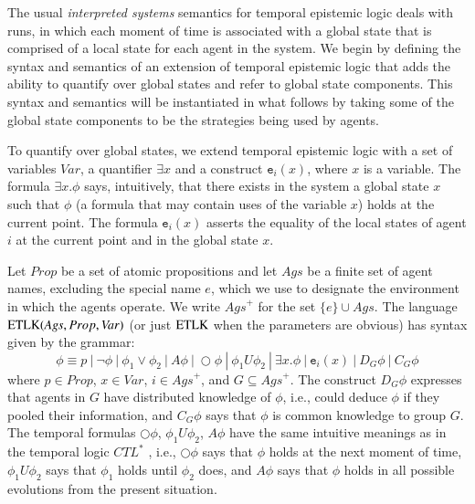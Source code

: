 \documentclass[a4wide]{article}
\newcommand{\until}{U}
\newcommand{\Prop}{Prop}
\newcommand{\SVar}{V\!ar}
\theoremstyle{examplesty}
\newcommand{\Ags}{\mathit{Ags}}
\newcommand{\Agse}{\mathit{Ags}^+}
\newcommand{\existsg}[1]{\exists #1.}
\newcommand{\lid}[2]{\mathtt{e}_{#1}(#2)}
\newcommand{\nxt}{\Circle}
\newcommand{\ETL}{{\rm ETLK}}
\begin{document}
The usual {\em interpreted systems} semantics for temporal epistemic logic \cite{FHMVbook}
deals with runs,  in which each moment of time is associated with a global state that 
is comprised of a local state for each agent in the system. 
We begin by defining the syntax and semantics of an extension of temporal epistemic logic that adds the
ability to quantify over global states and refer to global state components. 
This syntax and semantics will be instantiated in what follows by taking some of the global state 
components to be the strategies being used by agents. 

To quantify over global states, we extend temporal epistemic logic with a set of variables $\SVar$, 
a quantifier $\exists x$ 
and a construct $\lid{i}{x}$, 
where $x$ is a variable. The formula  $\existsg{x}\phi$ says, intuitively, that there exists in the system a global state $x$ such that $\phi$ (a formula that 
may contain uses of the variable $x$) holds
at the current point. The formula $\lid{i}{x}$ 
asserts the equality of the local states of agent $i$ at the current point and in the global state $x$. 

Let $\Prop$ be a set of atomic propositions and let $\Ags$ be a 
finite 
set of agent 
names, excluding the special name $e$, which we use to designate the environment in which the agents operate. 
We write $\Agse$ for the set $\{e\} \cup \Ags$. 
The 
language $\ETL(\Ags,  \Prop,\SVar)$
(or just $\ETL$ when the parameters are obvious) 
has syntax given by the grammar: 
$$\phi \equiv p ~|~\neg \phi~|~\phi_1 \lor \phi_2~|
~A\phi ~|~\nxt\phi ~|~\phi_1 \until \phi_2 ~
|~ \existsg{x}\phi~ |~ \lid{i}{x}~ | ~D_G\phi~|~C_G\phi$$ 
where $p \in \Prop$, $x\in \SVar$, 
$i\in \Agse$, and $G\subseteq \Agse$. 
The construct $D_G\phi$ expresses that agents in $G$ have  distributed knowledge of $\phi$, i.e., could deduce $\phi$ if they pooled their information, 
and $C_G\phi$ says that $\phi$ is common knowledge to group $G$. 
The temporal formulas $\nxt\phi$, $\phi_1 \until \phi_2$, $A\phi$ have the same intuitive meanings as in the temporal logic $CTL^*$ \cite{EH1986}, i.e., 
$\nxt \phi$ says that $\phi$ holds at the next moment of time, $\phi_1 \until \phi_2$ says that $\phi_1$ holds until $\phi_2$ does,  and
$A\phi$ says that $\phi$ holds in all possible evolutions from the present situation. 
\end{document}
